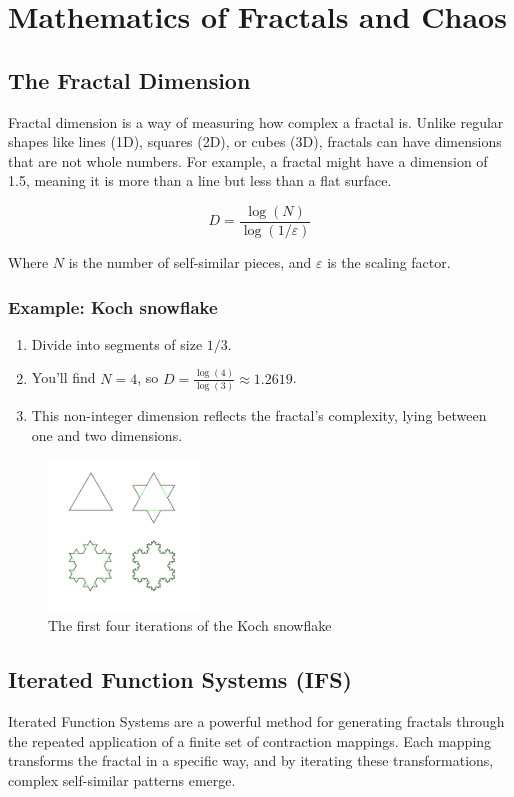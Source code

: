 \documentclass[12pt]{article}
\begin{document}
\section{Mathematics of Fractals and Chaos}


\subsection{The Fractal Dimension}
Fractal dimension is a way of measuring how complex a fractal is. Unlike regular shapes like lines (1D), squares (2D), or cubes (3D), fractals can have dimensions that are not whole numbers. For example, a fractal might have a dimension of 1.5, meaning it is more than a line but less than a flat surface. 

\[
D = \frac{\log(N)}{\log(1/\varepsilon)}
\]

Where \( N \) is the number of self-similar pieces, and \( \varepsilon \) is the scaling factor.

\subsubsection{Example: Koch snowflake}
	\begin{enumerate}
		\item Divide into segments of size \(1/3\).
		\item You’ll find \(N = 4\), so \(D = \frac{\log(4)}{\log(3)} \approx 1.2619\).
		\item This non-integer dimension reflects the fractal's complexity, lying between one and two dimensions.
	\end{enumerate}
\begin{figure}[H] \centering \includegraphics[width=0.36\textwidth]{assets/KochFlake.png} \caption{The first four iterations of the Koch snowflake} \label{fig:example} \end{figure}

\subsection{Iterated Function Systems (IFS)}
Iterated Function Systems are a powerful method for generating fractals through the repeated application of a finite set of contraction mappings. Each mapping transforms the fractal in a specific way, and by iterating these transformations, complex self-similar patterns emerge.
\end{document}
